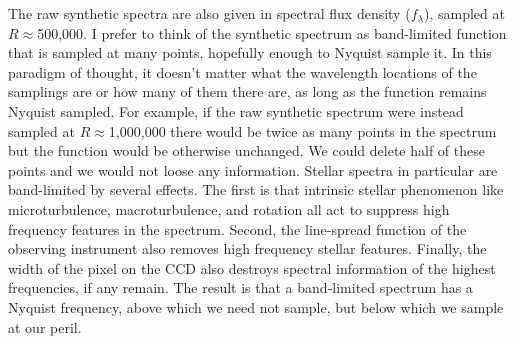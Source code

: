 \documentclass[preprint]{aastex} %
\begin{document}
The raw synthetic spectra are also given in spectral flux density ($f_\lambda$), sampled at $R\approx$500,000. I prefer to think of the synthetic spectrum as band-limited function that is sampled at many points, hopefully enough to Nyquist sample it. In this paradigm of thought, it doesn't matter what the wavelength locations of the samplings are or how many of them there are, as long as the function remains Nyquist sampled. For example, if the raw synthetic spectrum were instead sampled at $R\approx$1,000,000 there would be twice as many points in the spectrum but the function would be otherwise unchanged. We could delete half of these points and we would not loose any information. Stellar spectra in particular are band-limited by several effects. The first is that intrinsic stellar phenomenon like microturbulence, macroturbulence, and rotation all act to suppress high frequency features in the spectrum.  Second, the line-spread function of the observing instrument also removes high frequency stellar features. Finally, the width of the pixel on the CCD also destroys spectral information of the highest frequencies, if any remain. The result is that a band-limited spectrum has a Nyquist frequency, above which we need not sample, but below which we sample at our peril.
\end{document}
